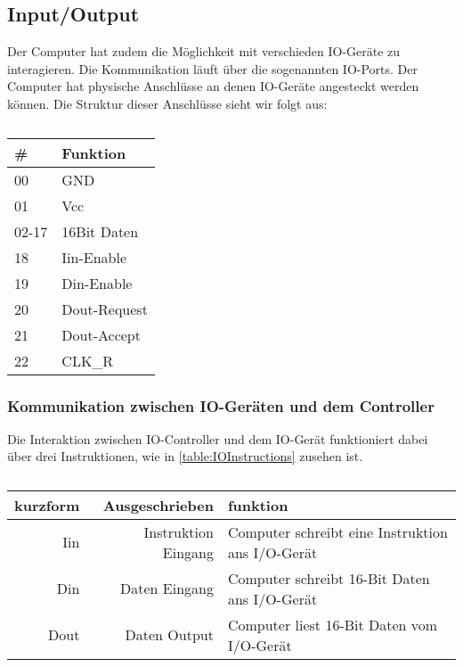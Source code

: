 \documentclass{scrartcl}
\begin{document}
\subsection{\label{section:io}Input/Output}

Der Computer hat zudem die Möglichkeit mit verschieden IO-Geräte zu interagieren.
Die Kommunikation läuft über die sogenannten IO-Ports.
Der Computer hat physische Anschlüsse an denen IO-Geräte angesteckt werden können.
Die Struktur dieser Anschlüsse sieht wir folgt aus:

\begin{center}
	\begin{table}[h]
		\caption{\label{table:IOPins}}
		\begin{tabular}{l | l}
			\# & Funktion \\
			\hline
			00 & GND \\
			01 & Vcc \\
			02-17 & 16Bit Daten \\
			18 & Iin-Enable \\
			19 & Din-Enable \\
			20 & Dout-Request \\
			21 & Dout-Accept \\
			22 & CLK\_R
 		\end{tabular}
	\end{table}
\end{center}



\subsubsection{\label{section:IO-Port}Kommunikation zwischen IO-Geräten und dem Controller}
Die Interaktion zwischen IO-Controller und dem IO-Gerät funktioniert dabei über drei Instruktionen, wie in \autoref{table:IOInstructions} zusehen ist.

\begin{center}
	\begin{table}[h]
		\caption{\label{table:IOInstructions}}
		\begin{tabular}{r | r | l}
			kurzform & Ausgeschrieben & funktion \\
			\hline
			Iin & Instruktion Eingang & Computer schreibt eine Instruktion ans I/O-Gerät \\
			Din & Daten Eingang & Computer schreibt 16-Bit Daten ans I/O-Gerät \\
			Dout &  Daten Output & Computer liest 16-Bit Daten vom I/O-Gerät
 		\end{tabular}
	\end{table}
\end{center}
\end{document}
